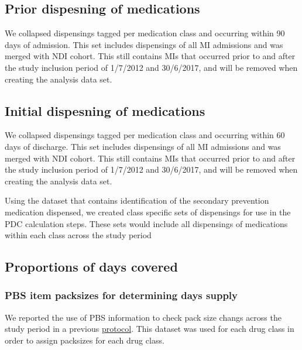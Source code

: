 \documentclass[11pt]{article}
\begin{document}
\color{violet}
\begin{stlog}\end{stlog}
\color{black}
\pagebreak
\subsection{Prior dispesning of medications}
We collapsed dispensings tagged per medication class and occurring within 90 days of admission. This set includes dispensings of all MI admissions and was merged with NDI cohort. This still contains MIs that occurred prior to and after the study inclusion period of 1/7/2012 and 30/6/2017, and will be removed when creating the analysis data set. 
\color{violet}
\begin{stlog}\end{stlog}
\color{black}
\pagebreak
\subsection{Initial dispesning of medications}
We collapsed dispensings tagged per medication class and occurring within 60 days of discharge. This set includes dispensings of all MI admissions and was merged with NDI cohort. This still contains MIs that occurred prior to and after the study inclusion period of 1/7/2012 and 30/6/2017, and will be removed when creating the analysis data set. 
\color{violet}
\begin{stlog}\end{stlog}
\color{black}
Using the dataset that contains identification of the secondary prevention medication dispensed, we created class specific sets of dispensings for use in the PDC calculation steps. These sets would include all dispensings of medications within each class across the study period
\color{violet}
\begin{stlog}\end{stlog}
\color{black}
\pagebreak
\subsection{Proportions of days covered}
\subsubsection{PBS item packsizes for determining days supply}
We reported the use of PBS information to check pack size changs across the study period in a previous  \href{https://github.com/cardiopharmnerd/medsremote}{protocol}. This dataset was used for each drug class in order to assign packsizes for each drug class. 
\end{document}
